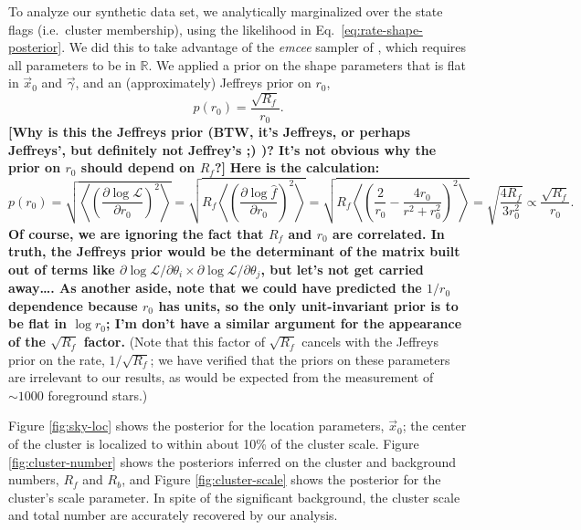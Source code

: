 \documentclass[aps,prd]{revtex4-1}
\newcommand{\ilya}[1]{{\color{red} \bf #1}}
\newcommand{\will}[1]{{\color{blue} \bf #1}}
\begin{document}
To analyze our synthetic data set, we analytically marginalized over
the state flags (i.e.~cluster membership), using the likelihood in
Eq.~\eqref{eq:rate-shape-posterior}.  We did this to take advantage of
the \textit{emcee} sampler of \citet{ForemanMackey2012}, which
requires all parameters to be in $\mathbb{R}$.  We applied a prior on
the shape parameters that is flat in $\vec{x}_0$ and $\vec{\gamma}$,
and an (approximately) Jeffreys prior on $r_0$,
\begin{equation}
  p\left( r_0 \right) = \frac{\sqrt{R_f}}{r_0}.
\end{equation}
\ilya{[Why is this the Jeffreys prior (BTW, it's Jeffreys, or perhaps
    Jeffreys', but definitely not Jeffrey's ;) )?  It's not obvious
    why the prior on $r_0$ should depend on $R_f$?]}  \will{Here is
  the calculation:
\begin{equation}
  p\left( r_0 \right) = \sqrt{\left\langle \left(\frac{\partial \log
      \mathcal{L}}{\partial r_0 } \right)^2 \right\rangle} = \sqrt{
    R_f \left\langle \left(\frac{\partial \log\hat{f}}{\partial r_0
    }\right)^2 \right\rangle } = \sqrt{R_f \left\langle \left(
    \frac{2}{r_0} - \frac{4 r_0}{r^2 + r_0^2} \right)^2 \right\rangle}
  = \sqrt{\frac{ 4 R_f}{3 r_0^2}} \propto \frac{\sqrt{R_f}}{r_0}.
\end{equation}
Of course, we are ignoring the fact that $R_f$ and $r_0$ are
correlated.  In truth, the Jeffreys prior would be the determinant of
the matrix built out of terms like $\partial \log\mathcal{L} /
\partial \theta_i \times \partial \log\mathcal{L} /\partial \theta_j$,
but let's not get carried away\ldots.  As another aside, note that we
could have predicted the $1/r_0$ dependence because $r_0$ has units,
so the only unit-invariant prior is to be flat in $\log r_0$; I'm
don't have a similar argument for the appearance of the $\sqrt{R_f}$
factor.}  (Note that this factor of $\sqrt{R_f}$ cancels with the
Jeffreys prior on the rate, $1/\sqrt{R_f}$; we have verified that the
priors on these parameters are irrelevant to our results, as would be
expected from the measurement of $\sim 1000$ foreground stars.)

Figure \ref{fig:sky-loc} shows the posterior for the location
parameters, $\vec{x}_0$; the center of the cluster is localized to
within about 10\% of the cluster scale.  Figure
\ref{fig:cluster-number} shows the posteriors inferred on the cluster
and background numbers, $R_f$ and $R_b$, and Figure
\ref{fig:cluster-scale} shows the posterior for the cluster's scale
parameter.  In spite of the significant background, the cluster scale
and total number are accurately recovered by our analysis.
\end{document}
